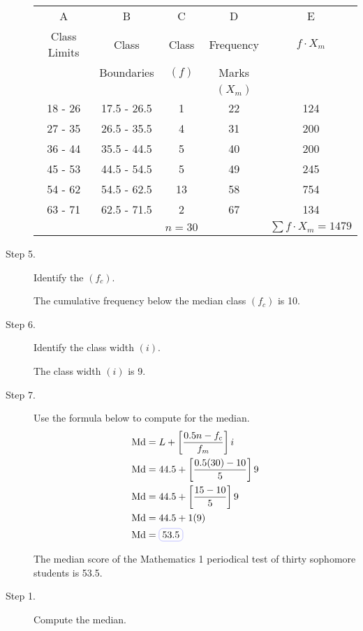 \begin{example}
\begin{myenumerate}
\begin{description}
\begin{center}
\begin{tabular}{ccccc}
\hline \hline
A & B & C & D & E\\
Class Limits & Class & Class & Frequency & $f\cdot X_m$\\
 & Boundaries & $(f)$ & Marks & \\
 &  &  & $(X_m)$ & \\
\hline
18 - 26 & 17.5 - 26.5 & 1  & 22 & 124 \\
27 - 35 & 26.5 - 35.5 & 4  & 31 & 200 \\ 
36 - 44 & 35.5 - 44.5 & 5  & 40 & 200 \\
45 - 53 & 44.5 - 54.5 & 5  & 49 & 245 \\
54 - 62 & 54.5 - 62.5 & 13 & 58 & 754 \\
63 - 71 & 62.5 - 71.5 & 2  & 67 & 134 \\
\hline
 & & $n=30$ & & $\sum f\cdot X_m=1479$ \\
\end{tabular}
\end{center}

\item[Step 5.] Identify the  $(f_c)$.

The cumulative frequency below the median class $(f_c)$ is 10.

\item[Step 6.] Identify the class width $(i)$.

The class width $(i)$ is 9.

\item[Step 7.] Use the formula below to compute for the median.
\begin{align*}
\Md&=L+\left[\frac{0.5n-f_c}{f_m}\right]i\\
\Md&=44.5+\left[\frac{0.5(30)-10}{5}\right]9\\
\Md&=44.5+\left[\frac{15-10}{5}\right]9\\
\Md&=44.5+1(9)\\
\Md&=\boxed{53.5}
\end{align*}

The median score of the Mathematics 1 periodical test of thirty
sophomore students is 53.5.
\end{description}

\item {}

\begin{description}
\item[Step 1.] Compute the median.


\end{description}
\end{myenumerate}
\end{example}
